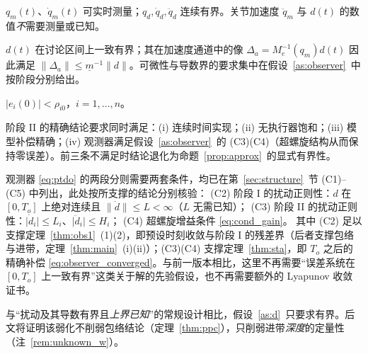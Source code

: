 \begin{assumption}[可测性与参考轨迹]\label{as:meas}
\(q_m(t)\)、\(\dot q_m(t)\) 可实时测量；\(q_d,\dot q_d,\ddot q_d\) 连续有界。关节加速度 \(\ddot q_m\) 与 \(d(t)\) 的数值\emph{不}需要测量或已知。
\end{assumption}

\begin{assumption}[扰动有界性与正则性]\label{as:d}
\(d(t)\) 在讨论区间上一致有界；其在加速度通道中的像 \(\Delta_a=M_e^{-1}(q_m)d(t)\) 因此满足 \(\lVert\Delta_a\rVert\le\underline m^{-1}\lVert d\rVert\)。可微性与导数界的要求集中在假设~\ref{as:observer}~中按阶段分别给出。
\end{assumption}

\begin{assumption}[初始条件]\label{as:ic}
\(\lvert e_i(0)\rvert<\rho_{i0}\)，\(i=1,\dots,n\)。
\end{assumption}

\begin{assumption}[精确归零]\label{as:ideal}
阶段 II 的精确结论要求同时满足：\textup{(i)} 连续时间实现；\textup{(ii)} 无执行器饱和；\textup{(iii)} 模型补偿精确；\textup{(iv)} 观测器满足假设~\ref{as:observer}~的 \textup{(C3)(C4)}（超螺旋结构从而保持零误差）。前三条不满足时结论退化为命题~\ref{prop:approx}~的显式有界性。
\end{assumption}

\begin{assumption}[观测器条件]\label{as:observer}
观测器 \eqref{eq:ptdo} 的两段分则需要两套条件，均已在第~\ref{sec:structure}~节 \textup{(C1)}--\textup{(C5)} 中列出，此处按所支撑的结论分别核验：
\textup{(C2)} 阶段 I 的扰动正则性：\(d\) 在 \([0,T_o]\) 上绝对连续且 \(\lVert\dot d\rVert\le L<\infty\)（\(L\) 无需已知）；
\textup{(C3)} 阶段 II 的扰动正则性：\(\lvert\dot d_i\rvert\le L_i\)、\(\lvert\ddot d_i\rvert\le H_i\)；
\textup{(C4)} 超螺旋增益条件 \eqref{eq:cond_gain}。
其中 \textup{(C2)} 足以支撑定理~\ref{thm:obs1}~(1)(2)，即预设时刻收敛与阶段 I 的残差界（后者支撑包络与进带，定理~\ref{thm:main}~(i)(ii)）；\textup{(C3)(C4)} 支撑定理~\ref{thm:sta}，即 \(T_o\) 之后的精确补偿 \eqref{eq:observer_converged}。与前一版本相比，这里不再需要“误差系统在 \([0,T_o]\) 上一致有界”这类关于解的先验假设，也不再需要额外的 Lyapunov 收敛证书。
\end{assumption}

\begin{remark}\label{rem:assumption_cmp}
与“扰动及其导数有界且\emph{上界已知}”的常规设计相比，假设~\ref{as:d}~只要求有界。后文将证明该弱化不削弱包络结论（定理~\ref{thm:ppc}），只削弱进带\emph{深度}的定量性（注~\ref{rem:unknown_w}）。\end{remark}
